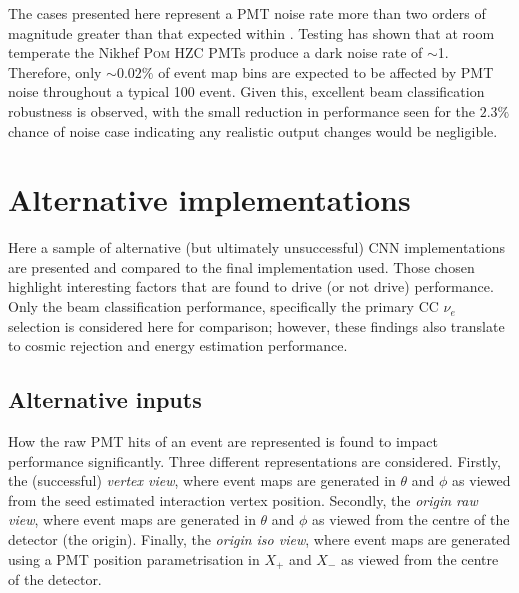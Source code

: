 The cases presented here represent a PMT noise rate more than two orders of magnitude greater than
that expected within \chipsfive. Testing has shown that at room temperate the Nikhef \textsc{Pom}
HZC PMTs produce a dark noise rate of $\sim$\SI{1}{}. Therefore, only $\sim0.02\%$ of
event map bins are expected to be affected by PMT noise throughout a typical \SI{100}{}
event. Given this, excellent beam classification robustness is observed, with the small reduction
in performance seen for the $2.3\%$ chance of noise case indicating any realistic output changes
would be negligible.

\section{Alternative implementations} %
\label{sec:results_alt} %

Here a sample of alternative (but ultimately unsuccessful) \chips CNN implementations are
presented and compared to the final implementation used. Those chosen highlight interesting
factors that are found to drive (or not drive) performance. Only the beam classification
performance, specifically the primary CC $\nu_{e}$ selection is considered here for comparison;
however, these findings also translate to cosmic rejection and energy estimation performance.

\subsection{Alternative inputs} %
\label{sec:results_alt_inputs} %

How the raw PMT hits of an event are represented is found to impact performance significantly.
Three different representations are considered. Firstly, the (successful) \emph{vertex view},
where event maps are generated in $\theta$ and $\phi$ as viewed from the seed estimated
interaction vertex position. Secondly, the \emph{origin raw view}, where event maps are generated
in $\theta$ and $\phi$ as viewed from the centre of the detector (the origin). Finally, the
\emph{origin iso view}, where event maps are generated using a PMT position parametrisation in
$X_{+}$ and $X_{-}$ as viewed from the centre of the detector.

